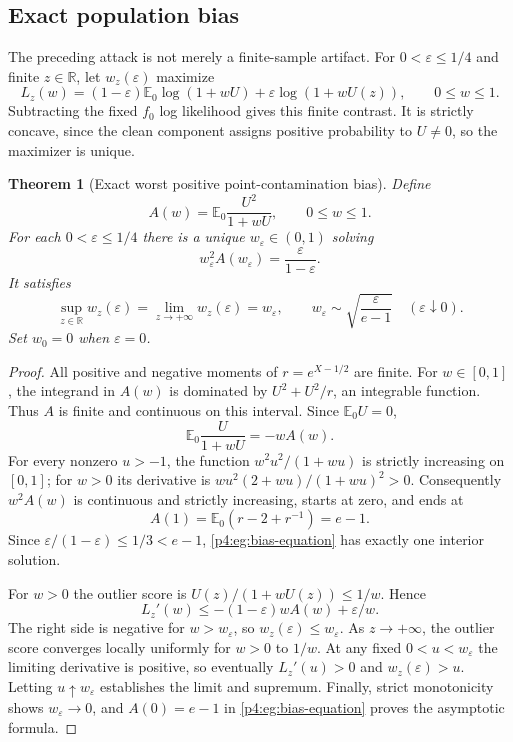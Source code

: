 \documentclass[11pt,a4paper]{article}
\newtheorem{theorem}{Theorem}[section]
\theoremstyle{definition}
\theoremstyle{remark}
\numberwithin{equation}{section}
\begin{document}
\subsection{Exact population bias}

The preceding attack is not merely a finite-sample artifact.
For $0<\varepsilon\le1/4$ and finite $z\in\mathbb R$, let
$w_z(\varepsilon)$ maximize
\[
 L_z(w)=(1-\varepsilon)\mathbb E_0\log(1+wU)
             +\varepsilon\log(1+wU(z)),\qquad 0\le w\le1.
\]
Subtracting the fixed $f_0$ log likelihood gives this finite
contrast. It is strictly concave, since the clean component assigns
positive probability to $U\ne0$, so the maximizer is unique.

\begin{theorem}[Exact worst positive point-contamination bias]
\label{p4:eg:population}
Define
\[
 A(w)=\mathbb E_0\frac{U^2}{1+wU},\qquad 0\le w\le1.
\]
For each $0<\varepsilon\le1/4$ there is a unique
$w_\varepsilon\in(0,1)$ solving
\begin{equation}\label{p4:eg:bias-equation}
 w_\varepsilon^2 A(w_\varepsilon)
       =\frac{\varepsilon}{1-\varepsilon}.
\end{equation}
It satisfies
\begin{equation}\label{p4:eg:bias-limit}
 \sup_{z\in\mathbb R} w_z(\varepsilon)
 =\lim_{z\to+\infty}w_z(\varepsilon)
 =w_\varepsilon,\qquad
 w_\varepsilon\sim\sqrt{\frac{\varepsilon}{e-1}}
 \quad(\varepsilon\downarrow0).
\end{equation}
Set $w_0=0$ when $\varepsilon=0$.
\end{theorem}

\begin{proof}
All positive and negative moments of $r=e^{X-1/2}$ are finite.
For $w\in[0,1]$, the integrand in $A(w)$ is dominated by
$U^2+U^2/r$, an integrable function. Thus $A$ is finite and
continuous on this interval. Since $\mathbb E_0U=0$,
\[
 \mathbb E_0\frac{U}{1+wU}=-wA(w).
\]
For every nonzero $u>-1$, the function $w^2u^2/(1+wu)$
is strictly increasing on $[0,1]$; for $w>0$ its derivative is
$wu^2(2+wu)/(1+wu)^2>0$.
Consequently $w^2A(w)$ is continuous and strictly increasing,
starts at zero, and ends at
\[
 A(1)=\mathbb E_0(r-2+r^{-1})=e-1.
\]
Since $\varepsilon/(1-\varepsilon)\le1/3<e-1$,
\eqref{p4:eg:bias-equation} has exactly one interior solution.

For $w>0$ the outlier score is
$U(z)/(1+wU(z))\le1/w$. Hence
\[
 L_z'(w)\le-(1-\varepsilon)wA(w)+\varepsilon/w.
\]
The right side is negative for $w>w_\varepsilon$, so
$w_z(\varepsilon)\le w_\varepsilon$.
As $z\to+\infty$, the outlier score converges locally uniformly
for $w>0$ to $1/w$. At any fixed $0<u<w_\varepsilon$ the
limiting derivative is positive, so eventually $L_z'(u)>0$ and
$w_z(\varepsilon)>u$. Letting $u\uparrow w_\varepsilon$
establishes the limit and supremum.
Finally, strict monotonicity shows $w_\varepsilon\to0$, and
$A(0)=e-1$ in \eqref{p4:eg:bias-equation} proves the asymptotic formula.
\end{proof}
\end{document}
